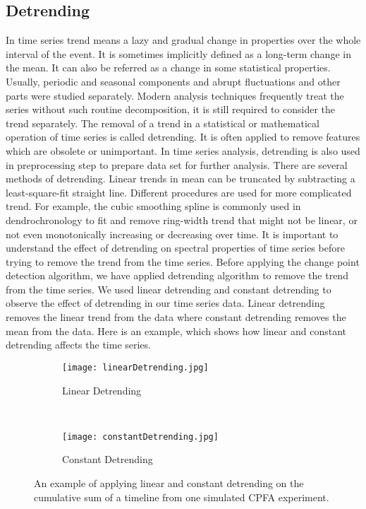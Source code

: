  \subsection{\label{Detrending}Detrending}
 In time series trend means a lazy and gradual change in properties over the whole interval of the event. It is sometimes implicitly defined as a long-term change in the mean. It can also be referred as a change in some statistical properties. Usually, periodic and seasonal components and abrupt fluctuations and other parts were studied separately. Modern analysis techniques frequently treat the series without such routine decomposition, it is still required to consider the trend separately. The removal of a trend in a statistical or mathematical operation of time series is called detrending. It is often applied to remove features which are obsolete or unimportant. In time series analysis, detrending is also used in preprocessing step to prepare data set for further analysis. There are several methods of detrending. Linear trends in mean can be truncated by subtracting a least-square-fit straight line. Different procedures are used for more complicated trend. For example, the cubic smoothing spline is commonly used in dendrochronology to fit and remove ring-width trend that might not be linear, or not even monotonically increasing or decreasing over time. It is important to understand the effect of detrending on spectral properties of time series before trying to remove the trend from the time series. Before applying the change point detection algorithm, we have applied detrending algorithm to remove the trend from the time series. We used linear detrending and constant detrending to observe the effect of detrending in our time series data. Linear detrending removes the linear trend from the data where constant detrending removes the mean from the data. Here is an example, which shows how linear and constant detrending affects the time series.
 \begin{figure}[h]
 	\begin{subfigure}{\textwidth}
 		\centering
 		\texttt{[image: linearDetrending.jpg]}
 		\caption{Linear Detrending}
 		\label{fig:Linear}
 	\end{subfigure}%
 \\
 	\begin{subfigure}{\textwidth}
 		\centering
 		\texttt{[image: constantDetrending.jpg]}
 		\caption{Constant Detrending}
 		\label{fig:Constant}
 	\end{subfigure}
 	\caption{An example of applying linear and constant detrending on the cumulative sum of a timeline from one simulated CPFA experiment.}
 	\label{fig:fig}
 \end{figure}
